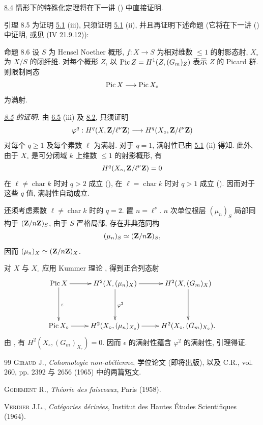 \hyperref[XII.lem8.4]{8.4} 情形下的特殊化定理将在下一讲 () 中直接证明.

\begin{enonce*}{引理 8.5}
为证明 {\rm \hyperref[XII.thm5.1]{5.1} (iii)}, 只须证明 {\rm \hyperref[XII.thm5.1]{5.1} (ii)}, 并且再证明下述命题 (它将在下一讲 {\rm ()} 中证明, 或见 {\rm (\EGA IV 21.9.12)}):
\end{enonce*}

\begin{enonce*}{命题 8.6}
设 $S$ 为 Hensel Noether 概形, $f:X\rightarrow S$ 为相对维数 $\leq1$ 的射影态射, $X_{\circ}$ 为 $X/S$ 的闭纤维. 对每个概形 $Z$, 以 $\operatorname{Pic} Z=H^1(Z,(G_m)_Z)$ 表示 $Z$ 的 Picard 群. 则限制同态
$$
\operatorname{Pic} X\longrightarrow \operatorname{Pic} X_{\circ}
$$
为满射.
\end{enonce*}

\noindent
\emph{\hyperref[XII.lem8.5]{8.5} 的证明.} 由 \hyperref[XII.prop6.5]{6.5} (iii) 及 \hyperref[XII.cor8.2]{8.2}, 只须证明
$$
\varphi^q:H^q(X,\mathbf{Z}/\ell^\nu \mathbf{Z})\longrightarrow
H^q(X_{\circ},\mathbf{Z}/\ell^{\nu}\mathbf{Z})
$$
对每个 $q\geq1$ 及每个素数 $\ell$ 为满射. 对于 $q=1$, 满射性已由 \hyperref[XII.thm5.1]{5.1} (ii) 得知. 此外, 由于 $X_{\circ}$ 是可分闭域 $k$ 上维数 $\leq1$ 的射影概形, 有
$$
H^q(X_{\circ},\mathbf{Z}/\ell^{\nu}\mathbf{Z})=0
$$
在 $\ell\neq\operatorname{char} k$ 时对 $q>2$ 成立 (), 在 $\ell=\operatorname{char} k$ 时对 $q>1$ 成立 (). 因而对于这些 $q$ 值, 满射性自动成立.

还\pageoriginale 须考虑素数 $\ell\neq\operatorname{char} k$ 时的 $q=2$. 置 $n=\ell^{\nu}$. $n$ 次单位根层 $(\mu_n)_S$ 局部同构于 $(\mathbf{Z}/n\mathbf{Z})_S$, 由于 $S$ 严格局部, 存在非典范同构
$$
(\mu_n)_S\simeq(\mathbf{Z}/n\mathbf{Z})_S,
$$
因而 $(\mu_n)_X\simeq(\mathbf{Z}/n\mathbf{Z})_X$.

对 $X$ 与 $X_{\circ}$ 应用 Kummer 理论 , 得到正合列态射
$$
\xymatrix@R=1.5cm{
\Pic X \ar[r] \ar[d]^{\epsilon}&
H^{2}(X,(\mu_n)_X) \ar[d]^{\varphi^2}\ar[r]&
H^{2}(X,(G_m)_X)\ar[d]\\
\Pic X_{\circ} \ar[r]&
H^2(X_{\circ},(\mu_n)_{X_{\circ}}) \ar[r]&
H^2(X_{\circ},(G_m)_{X_{\circ}}).
}
$$
由 , 有 $H^2(X_{\circ},(G_m)_{X_{\circ}})=0$. 因而 $\epsilon$ 的满射性蕴含 $\varphi^2$ 的满射性, 引理得证.

\begin{thebibliography}{99}
 \textsc{Giraud} J., \emph{Cohomologie non-abélienne}, 学位论文 (即将出版), 以及 C.R., vol. 260, pp. 2392 与 2656 (1965) 中的两篇短文.

 \textsc{Godement} R., \emph{Théorie des faisceaux}, Paris
(1958).

 \textsc{Verdier} J.L., \emph{Catégories dérivées},
Institut des Hautes Études Scientifiques (1964).
\end{thebibliography}


